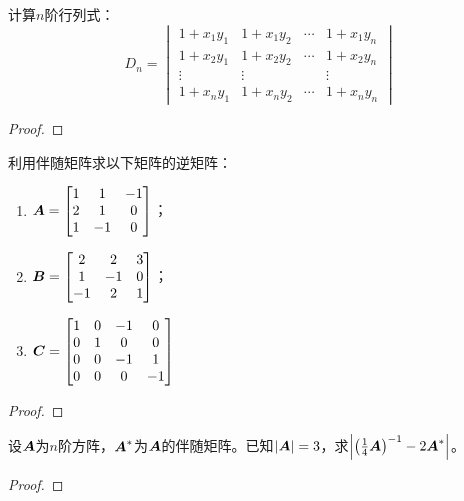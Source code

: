 \begin{problem}
计算\(n\)阶行列式：
\begin{equation*}
    D_n=
    \begin{vmatrix}
        1+x_{1}y_{1} & 1+x_{1}y_{2} & \cdots & 1+x_{1}y_{n} \\
        1+x_{2}y_{1} & 1+x_{2}y_{2} & \cdots & 1+x_{2}y_{n} \\
        \vdots       & \vdots       &        & \vdots       \\
        1+x_{n}y_{1} & 1+x_{n}y_{2} & \cdots & 1+x_{n}y_{n}
    \end{vmatrix}
\end{equation*}
\end{problem}
\begin{proof}
\end{proof}

\begin{problem}
利用伴随矩阵求以下矩阵的逆矩阵：
\begin{enumerate}
    \item \(\boldsymbol{A}=\begin{bmatrix}
              1 & 1  & -1 \\
              2 & 1  & 0  \\
              1 & -1 & 0
          \end{bmatrix}\)；
    \item \(\boldsymbol{B}=\begin{bmatrix}
              2  & 2  & 3 \\
              1  & -1 & 0 \\
              -1 & 2  & 1
          \end{bmatrix}\)；
    \item \(\boldsymbol{C}=\begin{bmatrix}
              1 & 0 & -1 & 0  \\
              0 & 1 & 0  & 0  \\
              0 & 0 & -1 & 1  \\
              0 & 0 & 0  & -1
          \end{bmatrix}\)
\end{enumerate}
\end{problem}
\begin{proof}
\end{proof}

\begin{problem}
设\(\boldsymbol{A}\)为\(n\)阶方阵，\(\boldsymbol{A}^*\)为\(\boldsymbol{A}\)的伴随矩阵。已知\(\left|\boldsymbol{A} \right|=3\)，求\(\left|{\left( \frac{1}{4}\boldsymbol{A} \right)}^{-1}-2\boldsymbol{A}^* \right|\)。
\end{problem}
\begin{proof}
\end{proof}

